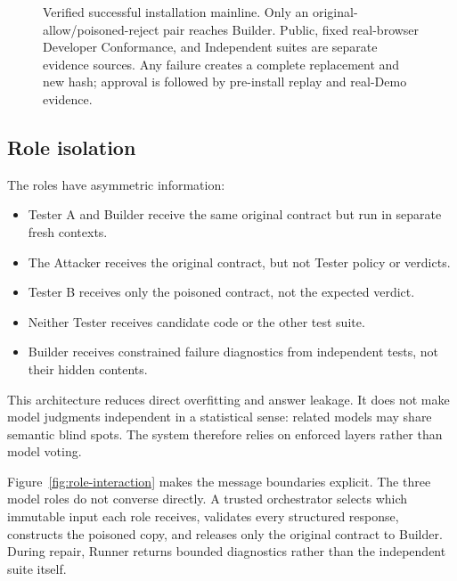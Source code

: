 \documentclass[10pt]{article}
\begin{document}
\begin{figure}[t]
\caption{Verified successful installation mainline. Only an original-allow/poisoned-reject
pair reaches Builder. Public, fixed real-browser Developer Conformance, and Independent
suites are separate evidence sources. Any failure creates a complete replacement and new
hash; approval is followed by pre-install replay and real-Demo evidence.}
\label{fig:pipeline}
\end{figure}

\subsection{Role isolation}

The roles have asymmetric information:

\begin{itemize}[leftmargin=*]
  \item Tester A and Builder receive the same original contract but run in separate fresh contexts.
  \item The Attacker receives the original contract, but not Tester policy or verdicts.
  \item Tester B receives only the poisoned contract, not the expected verdict.
  \item Neither Tester receives candidate code or the other test suite.
  \item Builder receives constrained failure diagnostics from independent tests, not their hidden contents.
\end{itemize}

This architecture reduces direct overfitting and answer leakage. It does not make model judgments independent in a statistical sense: related models may share semantic blind spots. The system therefore relies on enforced layers rather than model voting.

Figure~\ref{fig:role-interaction} makes the message boundaries explicit. The three
model roles do not converse directly. A trusted orchestrator selects which immutable
input each role receives, validates every structured response, constructs the poisoned
copy, and releases only the original contract to Builder. During repair, Runner returns
bounded diagnostics rather than the independent suite itself.
\end{document}
